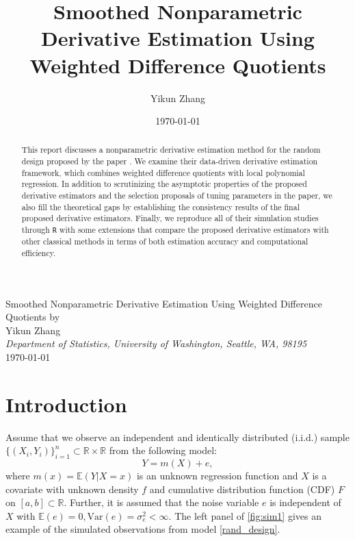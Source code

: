 \documentclass{uwstat572}
\title{Smoothed Nonparametric Derivative Estimation Using Weighted Difference Quotients}
\author{Yikun Zhang}
\date{\today}
\theoremstyle{definition}
\theoremstyle{theorem}
\begin{document}

\begin{center}
  {\LARGE Smoothed Nonparametric Derivative Estimation Using Weighted Difference Quotients by \cite{liu2020smoothed}}\\ \vspace{3mm}
  {Yikun Zhang \\ 
    {\it Department of Statistics, University of Washington, Seattle, WA, 98195}\\
    \today
  }
\end{center}


\begin{abstract}
  This report discusses a nonparametric derivative estimation method for the random design proposed by the paper \citep{liu2020smoothed}. We examine their data-driven derivative estimation framework, which combines weighted difference quotients with local polynomial regression. In addition to scrutinizing the asymptotic properties of the proposed derivative estimators and the selection proposals of tuning parameters in the paper, we also fill the theoretical gaps by establishing the consistency results of the final proposed derivative estimators. Finally, we reproduce all of their simulation studies through \texttt{R} with some extensions that compare the proposed derivative estimators with other classical methods in terms of both estimation accuracy and computational efficiency.
\end{abstract}

\section{Introduction}

Assume that we observe an independent and identically distributed (i.i.d.) sample $\{(X_i,Y_i)\}_{i=1}^n \subset \mathbb{R}\times \mathbb{R}$ from the following model:
\begin{equation}
\label{rand_design}
Y = m(X) + e,
\end{equation}
where $m(x)=\mathbb{E}(Y|X=x)$ is an unknown regression function and $X$ is a covariate with unknown density $f$ and cumulative distribution function (CDF) $F$ on $[a,b] \subset \mathbb{R}$. Further, it is assumed that the noise variable $e$ is independent of $X$ with $\mathbb{E}(e)=0, \mathrm{Var}(e)=\sigma_e^2 < \infty$. The left panel of \autoref{fig:sim1} gives an example of the simulated observations from model \eqref{rand_design}.
\end{document}
